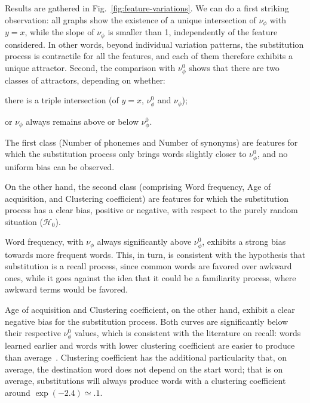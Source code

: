 Results are gathered in Fig.~\ref{fig:feature-variations}.
We can do a first striking observation: all graphs show the existence of a unique intersection of $\nu_{\phi}$ with $y=x$, while the slope of $\nu_{\phi}$ is smaller than 1, independently of the feature considered.
In other words, beyond individual variation patterns, the substitution process is contractile for all the features, and each of them therefore exhibits a unique attractor.
Second, the comparison with $\nu_{\phi}^0$ shows that there are two classes of attractors, depending on whether:
\begin{APAenumerate}
\item there is a triple intersection (of $y=x$, $\nu_{\phi}^0$ and $\nu_{\phi}$);
\item or $\nu_{\phi}$ always remains above or below $\nu_{\phi}^0$.
\end{APAenumerate}
The first class (Number of phonemes and Number of synonyms) are features for which the substitution process only brings words slightly closer to $\nu_{\phi}^0$, and no uniform bias can be observed.


On the other hand, the second class (comprising Word frequency, Age of acquisition, and Clustering coefficient) are features for which the substitution process has a clear bias, positive or negative, with respect to the purely random situation ($\mathcal{H}_0$).

Word frequency, with $\nu_{\phi}$ always significantly above $\nu_{\phi}^0$, exhibits a strong bias towards more frequent words. This, in turn, is consistent with the hypothesis that substitution is a recall process, since common words are favored over awkward ones, while it goes against the idea that it could be a familiarity process, where awkward terms would be favored.

Age of acquisition and Clustering coefficient, on the other hand, exhibit a clear negative bias for the substitution process. Both curves are significantly below their respective $\nu_{\phi}^0$ values, which is consistent with the literature on recall: words learned earlier and words with lower clustering coefficient are easier to produce than average~\citep{nelson2013activation,Zevin02}.
Clustering coefficient has the additional particularity that, on average, the destination word does not depend on the start word; that is on average, substitutions will always produce words with a clustering coefficient around $\exp(-2.4) \simeq .1$.

